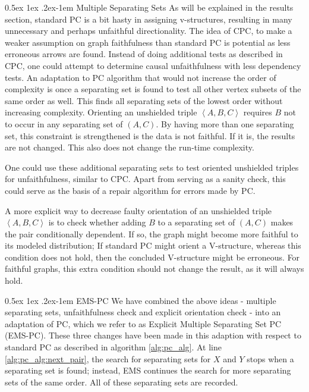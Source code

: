 \documentclass[a4paper, 10pt, english, onecolumn]{article}
\makeatletter
\renewcommand{\paragraph}{%
  \@startsection{paragraph}{4}%
  {\z@}{0.5ex \@plus 1ex \@minus .2ex}{-1em}%
  {\normalfont\normalsize\bfseries}%
}
\makeatother
\begin{document}
\paragraph{Multiple Separating Sets}
As will be explained in the results section, standard PC is a bit hasty in assigning v-structures, resulting in many unnecessary and perhaps unfaithful directionality.
The idea of CPC, to make a weaker assumption on graph faithfulness than standard PC is potential as less erroneous arrows are found.
Instead of doing additional tests as described in CPC, one could attempt to determine causal unfaithfulness with less dependency tests.
An adaptation to PC algorithm that would not increase the order of complexity is once a separating set is found to test all other vertex subsets of the same order as well.
This finds all separating sets of the lowest order without increasing complexity.
Orienting an unshielded triple $\left<A,B,C\right>$ requires $B$ not to occur in any separating set of $(A,C)$.
By having more than one separating set, this constraint is strengthened is the data is not faithful.
If it is, the results are not changed.
This also does not change the run-time complexity.

One could use these additional separating sets to test oriented unshielded triples for unfaithfulness, similar to CPC.
Apart from serving as a sanity check, this could serve as the basis of a repair algorithm for errors made by PC.

A more explicit way to decrease faulty orientation of an unshielded triple $\left<A,B,C\right>$ is to check whether adding $B$ to a separating set of $(A,C)$ makes the pair conditionally dependent.
If so, the graph might become more faithful to its modeled distribution; If standard PC might orient a V-structure, whereas this condition does not hold, then the concluded V-structure might be erroneous.
For faithful graphs, this extra condition should not change the result, as it will always hold.

\paragraph{EMS-PC}
We have combined the above ideas - multiple separating sets, unfaithfulness check and explicit orientation check - into an adaptation of PC, which we refer to as Explicit Multiple Separating Set PC (EMS-PC).
These three changes have been made in this adaption with respect to standard PC as described in algorithm \ref{alg:pc_alg}.
At line \ref{alg:pc_alg:next_pair}, the search for separating sets for $X$ and $Y$ stops when a separating set is found; instead, EMS continues the search for more separating sets of the same order.
All of these separating sets are recorded.
\end{document}
